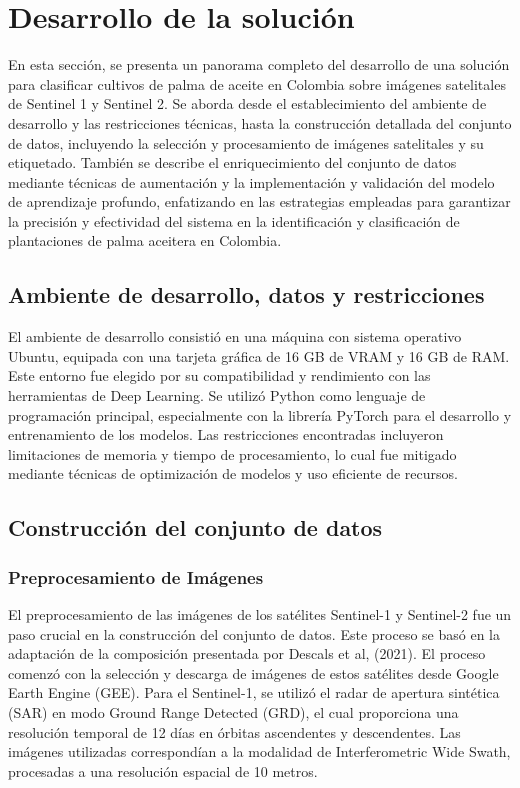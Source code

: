 \section{Desarrollo de la solución}

En esta sección, se presenta un panorama completo del desarrollo de una solución para clasificar cultivos de palma de aceite en Colombia sobre imágenes satelitales de Sentinel 1 y Sentinel 2. Se aborda desde el establecimiento del ambiente de desarrollo y las restricciones técnicas, hasta la construcción detallada del conjunto de datos, incluyendo la selección y procesamiento de imágenes satelitales y su etiquetado. También se describe el enriquecimiento del conjunto de datos mediante técnicas de aumentación y la implementación y validación del modelo de aprendizaje profundo, enfatizando en las estrategias empleadas para garantizar la precisión y efectividad del sistema en la identificación y clasificación de plantaciones de palma aceitera en Colombia.

\subsection{Ambiente de desarrollo, datos y restricciones}
El ambiente de desarrollo consistió en una máquina con sistema operativo Ubuntu, equipada con una tarjeta gráfica de 16 GB de VRAM y 16 GB de RAM. Este entorno fue elegido por su compatibilidad y rendimiento con las herramientas de Deep Learning. Se utilizó Python como lenguaje de programación principal, especialmente con la librería PyTorch para el desarrollo y entrenamiento de los modelos. Las restricciones encontradas incluyeron limitaciones de memoria y tiempo de procesamiento, lo cual fue mitigado mediante técnicas de optimización de modelos y uso eficiente de recursos.

\subsection{Construcción del conjunto de datos}

\subsubsection{Preprocesamiento de Imágenes}
El preprocesamiento de las imágenes de los satélites Sentinel-1 y Sentinel-2 fue un paso crucial en la construcción del conjunto de datos. Este proceso se basó en la adaptación de la composición presentada por Descals et al, (2021). El proceso comenzó con la selección y descarga de imágenes de estos satélites desde Google Earth Engine (GEE).  Para el Sentinel-1, se utilizó el radar de apertura sintética (SAR) en modo Ground Range Detected (GRD), el cual proporciona una resolución temporal de 12 días en órbitas ascendentes y descendentes. Las imágenes utilizadas correspondían a la modalidad de Interferometric Wide Swath, procesadas a una resolución espacial de 10 metros. 


